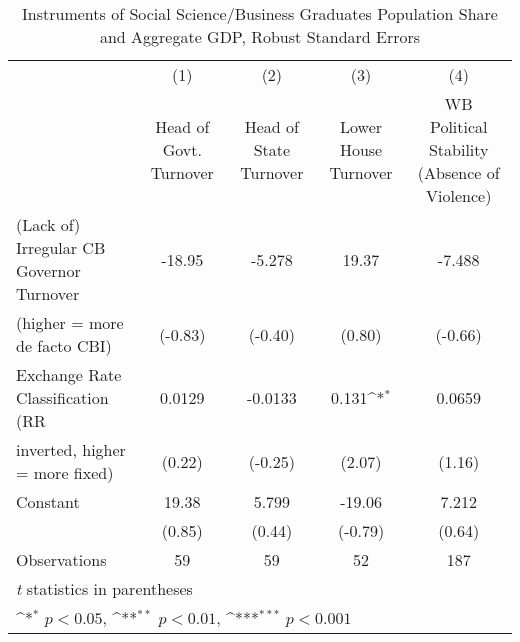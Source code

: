 \begin{table}[htbp]\centering
\def\sym#1{\ifmmode^{#1}\else\(^{#1}\)\fi}
\caption{Instruments of Social Science/Business Graduates Population Share and Aggregate GDP, Robust Standard Errors \label{ifivs4}}
\begin{tabular}{l*{4}{c}}
\toprule
                                        &\multicolumn{1}{c}{(1)}&\multicolumn{1}{c}{(2)}&\multicolumn{1}{c}{(3)}&\multicolumn{1}{c}{(4)}\\
                                        &\multicolumn{1}{c}{Head of Govt. Turnover}&\multicolumn{1}{c}{Head of State Turnover}&\multicolumn{1}{c}{Lower House Turnover}&\multicolumn{1}{c}{WB Political Stability (Absence of Violence)}\\
\midrule
(Lack of) Irregular CB Governor Turnover&   -18.95         &   -5.278         &    19.37         &   -7.488         \\
(higher = more de facto CBI)            &  (-0.83)         &  (-0.40)         &   (0.80)         &  (-0.66)         \\
\addlinespace
Exchange Rate Classification (RR        &   0.0129         &  -0.0133         &    0.131\sym{*}  &   0.0659         \\
inverted, higher = more fixed)          &   (0.22)         &  (-0.25)         &   (2.07)         &   (1.16)         \\
\addlinespace
Constant                                &    19.38         &    5.799         &   -19.06         &    7.212         \\
                                        &   (0.85)         &   (0.44)         &  (-0.79)         &   (0.64)         \\
\midrule
Observations                            &       59         &       59         &       52         &      187         \\
\bottomrule
\multicolumn{5}{l}{\footnotesize \textit{t} statistics in parentheses}\\
\multicolumn{5}{l}{\footnotesize \sym{*} \(p<0.05\), \sym{**} \(p<0.01\), \sym{***} \(p<0.001\)}\\
\end{tabular}
\end{table}

